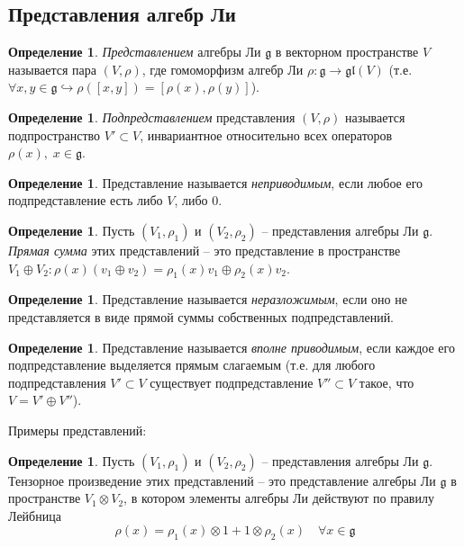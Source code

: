 \documentclass[12pt]{article}
\theoremstyle{definition}
\newtheorem{defin}[theorem]{Определение}
\begin{document}
\subsection{Представления алгебр Ли}
\begin{defin}
\textit{Представлением} алгебры Ли $\mathfrak{g}$ в векторном пространстве $V$ называется пара $(V,\rho)$, где гомоморфизм алгебр Ли $\rho:\mathfrak{g}\rightarrow\mathfrak{gl}(V)$ (т.е. $\forall x,y\in\mathfrak{g}\hookrightarrow\rho([x,y])=[\rho(x),\rho(y)]$).
\end{defin}
\begin{defin}
\textit{Подпредставлением} представления $(V,\rho)$ называется подпространство $V'\subset V$, инвариантное относительно всех операторов $\rho(x),\;x \in\mathfrak{g}$.
\end{defin}
\begin{defin}
Представление называется \textit{неприводимым}, если любое его подпредставление есть либо $V$, либо 0.
\end{defin}
\begin{defin}
Пусть $(V_1, \rho_1)$ и $(V_2, \rho_2)$ -- представления алгебры Ли $\mathfrak{g}$. \textit{Прямая сумма} этих представлений -- это представление в пространстве $V_1 \oplus V_2:\rho(x)(v_1 \oplus v_2) = \rho_1(x)v_1\oplus \rho_2(x)v_2$.
\end{defin}
\begin{defin}
Представление называется \textit{неразложимым}, если оно не представляется в виде прямой суммы собственных подпредставлений.
\end{defin}
\begin{defin}
Представление называется \textit{вполне приводимым}, если каждое его подпредставление выделяется прямым слагаемым (т.е. для любого подпредставления $V'\subset V$ существует подпредставление $V''\subset V$ такое, что $V = V' \oplus V''$).
\end{defin}
Примеры представлений:
\begin{defin}
Пусть $(V_1, \rho_1)$ и $(V_2, \rho_2)$ -- представления алгебры Ли $\mathfrak{g}$. Тензорное произведение этих представлений -- это представление алгебры Ли $\mathfrak{g}$ в пространстве $V_1\otimes V_2$, в котором элементы алгебры Ли действуют по правилу Лейбница
\begin{equation}
    \rho(x)=\rho_1(x)\otimes1+1\otimes\rho_2(x)\quad\forall x\in\mathfrak{g}
\end{equation}
\end{defin}
\end{document}

